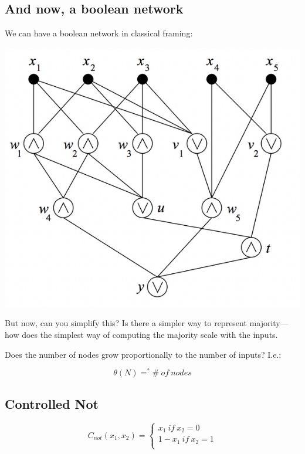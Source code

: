 \documentclass[letterpaper]{article}
\begin{document}
\subsection{And now, a boolean network}
\label{sec:orgc041ce2}
We can have a boolean network in classical framing:

\begin{center}
\includegraphics[width=.9\linewidth]{2022-03-02_09-10-04_screenshot.png}
\end{center}

But now, can you simplify this? Is there a simpler way to represent majority---how does the simplest way of computing the majority scale with the inputs.

Does the number of nodes grow proportionally to the number of inputs? I.e.:

\begin{equation}
   \theta(N) =^? \#\ of\ nodes 
\end{equation}

\subsection{Controlled Not}
\label{sec:org903a9c5}
\begin{equation}
   C_{not}(x_1, x_2) = \begin{cases}
x_1\ if\ x_2 = 0\\
1-x_1\ if\ x_2 = 1\\
\end{cases}
\end{equation}
\end{document}
